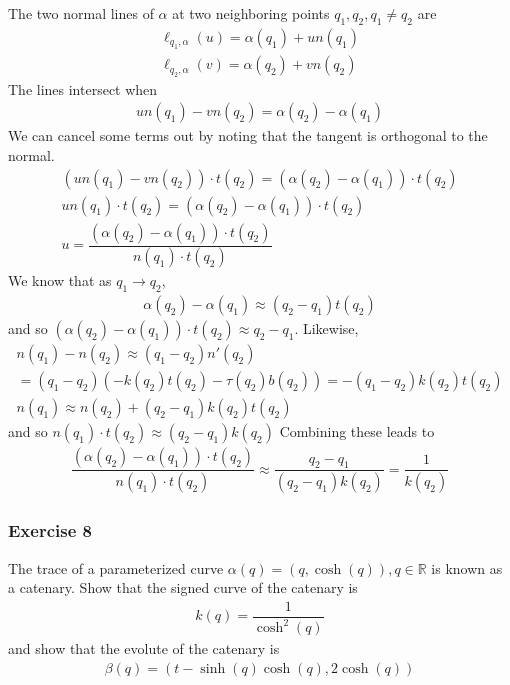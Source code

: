 \documentclass{article}
\newcommand{\R}{\mathbb{R}}
\begin{document}
	The two normal lines of $\alpha$ at two neighboring points $q_1, q_2, q_1 \neq q_2$ are
	\begin{gather*}
		\ell_{q_1,\alpha}(u) = \alpha(q_1) + un(q_1) \\
		\ell_{q_2,\alpha}(v) = \alpha(q_2) + vn(q_2)
	\end{gather*}
	The lines intersect when
	\begin{gather*}
		un(q_1) - vn(q_2) = \alpha(q_2) - \alpha(q_1)
	\end{gather*}
	We can cancel some terms out by noting that the tangent is orthogonal to the normal.
	\begin{gather*}
		( un(q_1) - vn(q_2) ) \cdot t(q_2) = ( \alpha(q_2) - \alpha(q_1) ) \cdot t(q_2) \\
		un(q_1) \cdot t(q_2) = ( \alpha(q_2) - \alpha(q_1) ) \cdot t(q_2) \\
		u = \dfrac{( \alpha(q_2) - \alpha(q_1) ) \cdot t(q_2)}{n(q_1) \cdot t(q_2)}
	\end{gather*}
	We know that as $q_1 \to q_2$,
	\begin{gather*}
		\alpha(q_2) - \alpha(q_1) \approx (q_2 - q_1) t(q_2)
	\end{gather*}
	and so $( \alpha(q_2) - \alpha(q_1) ) \cdot t(q_2) \approx q_2 - q_1$. Likewise,
	\begin{gather*}
		n(q_1) - n(q_2) \approx (q_1 - q_2) n'(q_2) \\
		= (q_1 - q_2) \left( -k(q_2) t(q_2) - \tau(q_2) b(q_2) \right) = -(q_1 - q_2) k(q_2) t(q_2) \\
		n(q_1) \approx n(q_2) + (q_2 - q_1) k(q_2) t(q_2)
	\end{gather*}
	and so $n(q_1) \cdot t(q_2) \approx (q_2 - q_1) k(q_2) $
	Combining these leads to
	\begin{gather*}
		\dfrac{( \alpha(q_2) - \alpha(q_1) ) \cdot t(q_2)}{n(q_1) \cdot t(q_2)}
		\approx \dfrac{q_2 - q_1}{(q_2 - q_1) k(q_2)} = \dfrac{1}{k(q_2)}
	\end{gather*}
	
	\subsubsection*{Exercise 8}
	The trace of a parameterized curve $\alpha(q) = \left( q, \cosh(q) \right), q \in \R$ is known as a catenary. Show that the signed curve of the catenary is
	\begin{gather*}
		k(q) = \dfrac{1}{\cosh^2(q)}
	\end{gather*}
	and show that the evolute of the catenary is
	\begin{gather*}
		\beta(q) = \left( t - \sinh(q) \cosh(q), 2 \cosh(q) \right)
	\end{gather*}
	
\end{document}
